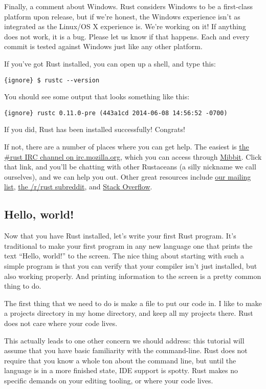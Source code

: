 \documentclass[]{article}
\begin{document}
Finally, a comment about Windows. Rust considers Windows to be a
first-class platform upon release, but if we're honest, the Windows
experience isn't as integrated as the Linux/OS X experience is. We're
working on it! If anything does not work, it is a bug. Please let us
know if that happens. Each and every commit is tested against Windows
just like any other platform.

If you've got Rust installed, you can open up a shell, and type this:

\texttt{\{ignore\} \$ rustc -\/-version}

You should see some output that looks something like this:

\texttt{\{ignore\} rustc 0.11.0-pre (443a1cd 2014-06-08 14:56:52 -0700)}

If you did, Rust has been installed successfully! Congrats!

If not, there are a number of places where you can get help. The easiest
is \href{irc://irc.mozilla.org/\#rust}{the \#rust IRC channel on
irc.mozilla.org}, which you can access through
\href{http://chat.mibbit.com/?server=irc.mozilla.org\&channel=\%23rust}{Mibbit}.
Click that link, and you'll be chatting with other Rustaceans (a silly
nickname we call ourselves), and we can help you out. Other great
resources include \href{https://mail.mozilla.org/listinfo/rust-dev}{our
mailing list}, \href{http://www.reddit.com/r/rust}{the /r/rust
subreddit}, and
\href{http://stackoverflow.com/questions/tagged/rust}{Stack Overflow}.

\subsection{Hello, world!}\label{hello-world}

Now that you have Rust installed, let's write your first Rust program.
It's traditional to make your first program in any new language one that
prints the text ``Hello, world!'' to the screen. The nice thing about
starting with such a simple program is that you can verify that your
compiler isn't just installed, but also working properly. And printing
information to the screen is a pretty common thing to do.

The first thing that we need to do is make a file to put our code in. I
like to make a projects directory in my home directory, and keep all my
projects there. Rust does not care where your code lives.

This actually leads to one other concern we should address: this
tutorial will assume that you have basic familiarity with the
command-line. Rust does not require that you know a whole ton about the
command line, but until the language is in a more finished state, IDE
support is spotty. Rust makes no specific demands on your editing
tooling, or where your code lives.
\end{document}
